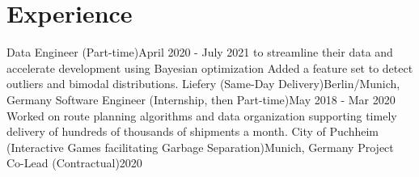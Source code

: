 \documentclass[a4paper,20pt]{article}
\begin{document}


\vspace{-5pt}
\section{Experience}
  \resumeSubHeadingListStart
    {Data Engineer (Part-time)}{April 2020 - July 2021}
    \resumeItemListStart
          {to streamline their data and accelerate development using Bayesian optimization}
          {Added a feature set to detect outliers and bimodal distributions.}
      \resumeItemListEnd
    \resumeSubheading
		{Liefery (Same-Day Delivery)}{Berlin/Munich, Germany}
		{Software Engineer (Internship, then Part-time)}{May 2018 - Mar 2020}
		\resumeItemListStart
          {Worked on route planning algorithms and data organization supporting timely delivery of hundreds of thousands of shipments a month.}
		\resumeItemListEnd
    \resumeSubheading
		{City of Puchheim (Interactive Games facilitating Garbage Separation)}{Munich, Germany}
		{Project Co-Lead (Contractual)}{2020}
		\resumeItemListStart
		\resumeItemListEnd

\resumeSubHeadingListEnd

\vspace{-5pt}
\end{document}

